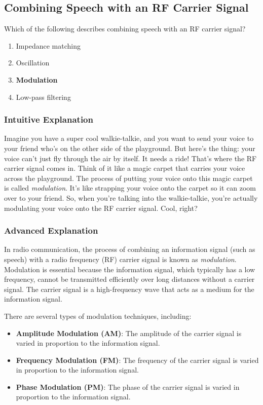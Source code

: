 \subsection{Combining Speech with an RF Carrier Signal}
\label{T7A08}

\begin{tcolorbox}[colback=gray!10!white,colframe=black!75!black,title=T7A08]
Which of the following describes combining speech with an RF carrier signal?
\begin{enumerate}[label=\Alph*)]
    \item Impedance matching
    \item Oscillation
    \item \textbf{Modulation}
    \item Low-pass filtering
\end{enumerate}
\end{tcolorbox}

\subsubsection{Intuitive Explanation}
Imagine you have a super cool walkie-talkie, and you want to send your voice to your friend who’s on the other side of the playground. But here’s the thing: your voice can’t just fly through the air by itself. It needs a ride! That’s where the RF carrier signal comes in. Think of it like a magic carpet that carries your voice across the playground. The process of putting your voice onto this magic carpet is called \textit{modulation}. It’s like strapping your voice onto the carpet so it can zoom over to your friend. So, when you’re talking into the walkie-talkie, you’re actually modulating your voice onto the RF carrier signal. Cool, right?

\subsubsection{Advanced Explanation}
In radio communication, the process of combining an information signal (such as speech) with a radio frequency (RF) carrier signal is known as \textit{modulation}. Modulation is essential because the information signal, which typically has a low frequency, cannot be transmitted efficiently over long distances without a carrier signal. The carrier signal is a high-frequency wave that acts as a medium for the information signal.

There are several types of modulation techniques, including:
\begin{itemize}
    \item \textbf{Amplitude Modulation (AM)}: The amplitude of the carrier signal is varied in proportion to the information signal.
    \item \textbf{Frequency Modulation (FM)}: The frequency of the carrier signal is varied in proportion to the information signal.
    \item \textbf{Phase Modulation (PM)}: The phase of the carrier signal is varied in proportion to the information signal.
\end{itemize}

